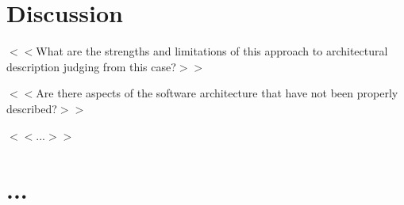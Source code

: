 \documentclass[a4paper,10pt]{article}
\begin{document}
\section{Discussion}
$<<$What are the strengths and limitations of this approach to
architectural description judging from this case?$>>$

$<<$Are there aspects of the software architecture that have not been
properly described?$>>$

$<<$...$>>$

\section{...}



\end{document}
